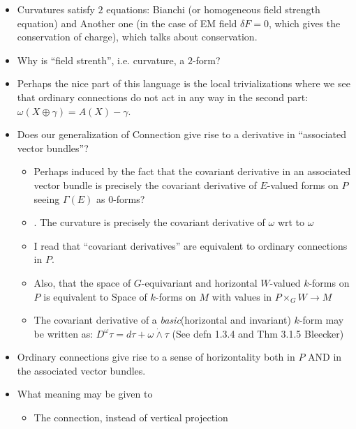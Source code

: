 \begin{itemize}
    \item Curvatures satisfy $2$ equations: Bianchi (or homogeneous field strength equation) and Another one (in the case of EM field $\delta F = 0$, which gives the conservation of charge), which talks about conservation.
    
    \item Why is ``field strenth'', i.e. curvature, a $2$-form?
    
    \item Perhaps the nice part of this language is the local trivializations where we see that ordinary connections do not act in any way in the second part: $\omega(X \oplus \gamma) = A(X) - \gamma$.
    
    \item Does our generalization of Connection give rise to a  derivative in ``associated vector bundles''?
    \begin{itemize}
        \item Perhaps induced by the fact that the covariant derivative in an associated vector bundle is precisely the covariant derivative of $E$-valued forms on $P$ seeing $\Gamma(E)$ as $0$-forms?
        
        \item {}. The curvature is precisely the covariant derivative of $\omega$ wrt to $\omega$
        
        \item I read that ``covariant derivatives'' are equivalent to ordinary connections in $P$.
        
        \item Also, that the space of $G$-equivariant and horizontal $W$-valued $k$-forms on $P$ is equivalent to Space of $k$-forms on $M$ with values in $P\times_G W \to M$
        
        \item The covariant derivative of a \emph{basic}(horizontal and invariant) $k$-form may be written as: $D^\omega \tau = d\tau + \omega \dot{\wedge} \tau$ (See defn 1.3.4 and Thm 3.1.5 Bleecker) 
    \end{itemize}
    
    
    \item Ordinary connections give rise to a sense of horizontality both in $P$ AND in the associated vector bundles.
    
    \item What meaning may be given to
    \begin{itemize}
        \item The connection, instead of vertical projection
        

\end{itemize}
\end{itemize}
